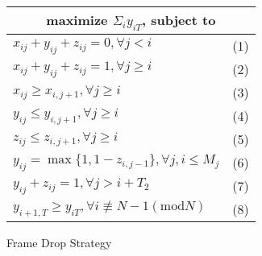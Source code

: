 \begin{figure}[tb]
\centering
{\setlength{\tabcolsep}{3pt}
\begin{tabular}{|l|l|}
\hline
\multicolumn{2}{|c|}{ maximize $\Sigma_i y_{iT}$, subject to} \\ \hline \hline
 $x_{ij}+y_{ij}+z_{ij} = 0, \forall j<i$       & (1)        \\
 $x_{ij}+y_{ij}+z_{ij} = 1, \forall j\geq i$   & (2)       \\
 $x_{ij} \geq x_{i,j+1}, \forall j\geq i$      & (3)        \\
 $y_{ij} \leq y_{i,j+1}, \forall j\geq i$      & (4)        \\
 $z_{ij} \leq z_{i,j+1}, \forall j\geq i$      & (5)        \\ \hline
 $y_{ij} = \max\{1,{1-z_{i,j-1}}\}, \forall j, i \leq M_{j}$  & (6)   \\ \hline
 $y_{ij}+z_{ij} = 1 ,\forall j>i+T_2$          & (7)        \\ \hline
 $y_{i+1,T} \geq y_{iT}, \forall i \not\equiv N-1 (\text{mod}N)$ &(8) \\ \hline
\end{tabular}}
\caption{Frame Drop Strategy}
\vspace{-0.3in}
\label{fig:ip-program} 
\end{figure}
